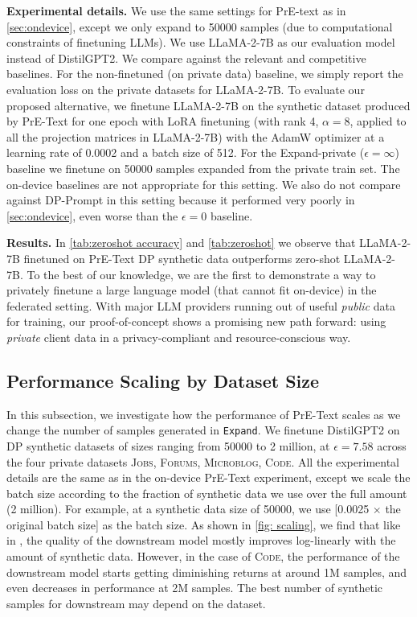 \textbf{Experimental details.}  We use the same settings for PrE-text as in \cref{sec:ondevice}, except we only expand to 50000 samples (due to computational constraints of finetuning LLMs).  We use LLaMA-2-7B as our evaluation model instead of DistilGPT2.  We compare against the relevant and competitive baselines. For the non-finetuned (on private data) baseline, we simply report the evaluation loss on the private datasets for LLaMA-2-7B.  To evaluate our proposed alternative, we finetune LLaMA-2-7B on the synthetic dataset produced by PrE-Text for one epoch with LoRA finetuning (with rank 4, $\alpha=8$, applied to all the projection matrices in LLaMA-2-7B) with the AdamW optimizer at a learning rate of 0.0002 and a batch size of 512. For the Expand-private ($\epsilon=\infty$) baseline we finetune on 50000 samples expanded from the private train set.
The on-device baselines are not appropriate for this setting. We also do not compare against DP-Prompt in this setting because it performed very poorly in \cref{sec:ondevice}, even worse than the $\epsilon=0$ baseline. 

\textbf{Results.} In \cref{tab:zeroshot accuracy} and \cref{tab:zeroshot} we observe that LLaMA-2-7B finetuned on PrE-Text DP synthetic data outperforms zero-shot LLaMA-2-7B. To the best of our knowledge, we are the first to demonstrate a way to privately finetune a large language model (that cannot fit on-device) in the federated setting. With major LLM providers running out of useful \textit{public} data \citep{runout, runout2, runout3, runout4} for training, our proof-of-concept shows a promising new path forward: using \textit{private} client data in a privacy-compliant and resource-conscious way.

\subsection{Performance Scaling by Dataset Size}
In this subsection, we investigate how the performance of PrE-Text scales as we change the number of samples generated in \texttt{Expand}. We finetune DistilGPT2 on DP synthetic datasets of sizes ranging from 50000 to 2 million, at $\epsilon=7.58$ across the four private datasets  \textsc{Jobs},  \textsc{Forums}, \textsc{Microblog}, \textsc{Code}. All the experimental details are the same as in the on-device PrE-Text experiment, except we scale the batch size according to the fraction of synthetic data we use over the full amount (2 million). For example, at a synthetic data size of 50000, we use [0.0025 $\times$ the original batch size] as the batch size. As shown in \cref{fig: scaling}, we find that like in \citep{honovich2022unnatural}, the quality of the downstream model mostly improves log-linearly with the amount of synthetic data. However, in the case of \textsc{Code}, the performance of the downstream model starts getting diminishing returns at around 1M samples, and even decreases in performance at 2M samples. The best number of synthetic samples for downstream may depend on the dataset. 

